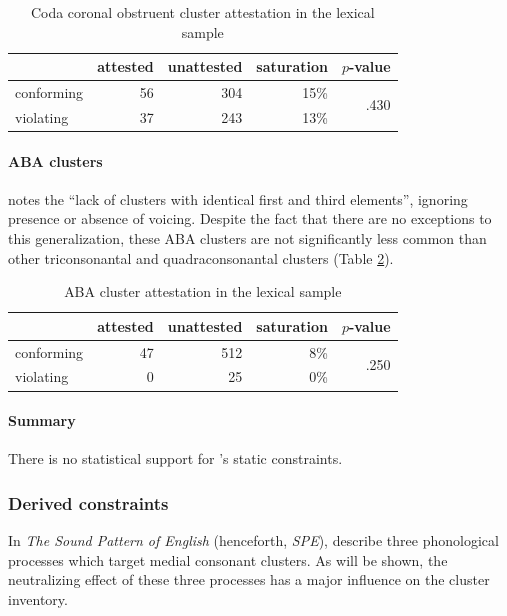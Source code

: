 \begin{table}
\centering
\begin{tabular}{l rrrr}
\toprule
           & attested & unattested & saturation & $p$-value \\
\midrule
conforming & 56       & 304        & 15\%       & \multirow{2}{*}{.430} \\
violating  & 37       & 243        & 13\%       \\
\bottomrule
\end{tabular}
\caption{Coda coronal obstruent cluster attestation in the lexical sample}
\label{cctab}
\end{table}

\paragraph{ABA clusters} 
\citet[176]{Pierrehumbert1994} notes the ``lack of clusters with identical first and third elements'', ignoring presence or absence of voicing. 
Despite the fact that there are no exceptions to this generalization, these \textsc{ABA} clusters are not significantly less common than other triconsonantal and quadraconsonantal clusters (Table \ref{abatab}).

\begin{table}
\centering
\begin{tabular}{l rrrr}
\toprule
           & attested & unattested & saturation & $p$-value \\
\midrule
conforming & 47       & 512        &  8\%       & \multirow{2}{*}{.250} \\
violating  &  0       &  25        &  0\%       \\
\bottomrule
\end{tabular}
\caption{ABA cluster attestation in the lexical sample}
\label{abatab}
\end{table}

\paragraph{Summary} 
There is no statistical support for \citeauthor{Pierrehumbert1994}'s static constraints.

\subsubsection{Derived constraints}

In \emph{The Sound Pattern of English} (henceforth, \emph{SPE}), \citet{SPE} describe three phonological processes which target medial consonant clusters. As will be shown, the neutralizing effect of these three processes has a major influence on the cluster inventory.

